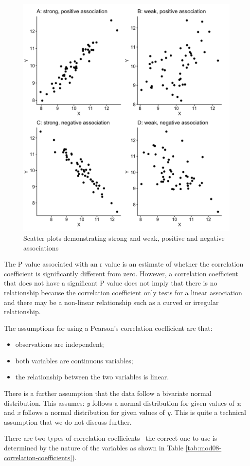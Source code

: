 \documentclass[
]{memoir}
\providecommand{\tightlist}{%
  \setlength{\itemsep}{0pt}\setlength{\parskip}{0pt}}
\begin{document}
\begin{figure}
\includegraphics[width=0.66\linewidth]{img/mod08/scatterplot-four-plots} \caption{Scatter plots demonstrating strong and weak, positive and negative associations}\label{fig:scatter-plot-four}
\end{figure}

The P value associated with an r value is an estimate of whether the correlation coefficient is significantly different from zero. However, a correlation coefficient that does not have a significant P value does not imply that there is no relationship because the correlation coefficient only tests for a linear association and there may be a non-linear relationship such as a curved or irregular relationship.

The assumptions for using a Pearson's correlation coefficient are that:

\begin{itemize}
\tightlist
\item
  observations are independent;
\item
  both variables are continuous variables;
\item
  the relationship between the two variables is linear.
\end{itemize}

There is a further assumption that the data follow a bivariate normal distribution. This assumes: \emph{y} follows a normal distribution for given values of \emph{x}; and \emph{x} follows a normal distribution for given values of \emph{y}. This is quite a technical assumption that we do not discuss further.

There are two types of correlation coefficients-- the correct one to use is determined by the nature of the variables as shown in Table \ref{tab:mod08-correlation-coefficients}).
\end{document}

